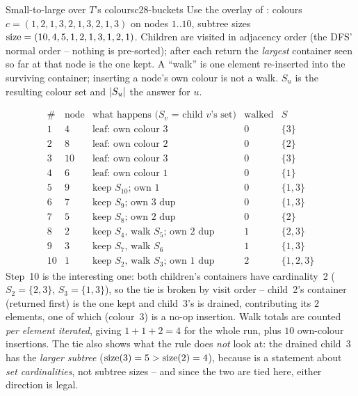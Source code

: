 \begin{example}{Small-to-large over \(T\)'s colours}{c28-buckets}
Use the overlay of : colours
\(c=(1,2,1,3,2,1,3,2,1,3)\) on nodes \(1..10\), subtree sizes
\(\operatorname{size}=(10,4,5,1,2,1,3,1,2,1)\).  Children are visited in adjacency order
(the DFS' normal order -- nothing is pre-sorted); after each return the
\emph{largest} container seen so far at that node is the one kept.  A
``walk'' is one element re-inserted into the surviving container; inserting a
node's own colour is not a walk.  \(S_u\) is the resulting colour set and
\(\lvert S_u\rvert\) the answer for \(u\).
\end{example}
\begin{tracebox}
{\small
\[
\renewcommand{\arraystretch}{1.2}
\begin{array}{c|c|l|c|c}
\text{\#} & \text{node} & \text{what happens (}S_v\text{ = child }v\text{'s set)} & \text{walked} & S \\ \hline
1 & 4 & \text{leaf: own colour } 3 & 0 & \{3\}\\
2 & 8 & \text{leaf: own colour } 2 & 0 & \{2\}\\
3 & 10& \text{leaf: own colour } 3 & 0 & \{3\}\\
4 & 6 & \text{leaf: own colour } 1 & 0 & \{1\}\\
5 & 9 & \text{keep } S_{10}\text{;}\text{ own } 1 & 0 & \{1,3\}\\
6 & 7 & \text{keep } S_{9}\text{;}\text{ own } 3\text{ dup} & 0 & \{1,3\}\\
7 & 5 & \text{keep } S_{8}\text{;}\text{ own } 2\text{ dup} & 0 & \{2\}\\
8 & 2 & \text{keep } S_{4}\text{, walk } S_{5}\text{;}\text{ own } 2\text{ dup} & 1 & \{2,3\}\\
9 & 3 & \text{keep } S_{7}\text{, walk } S_{6} & 1 & \{1,3\}\\
10& 1 & \text{keep } S_{2}\text{, walk } S_{3}\text{;}\text{ own } 1\text{ dup} & 2 & \{1,2,3\}
\end{array}
\]
}
Step~10 is the interesting one: both children's containers have
cardinality~2 (\(S_2=\{2,3\}\), \(S_3=\{1,3\}\)), so the tie is broken by
visit order -- child~2's container (returned first) is the one kept and
child~3's is drained, contributing its \(2\) elements, one of which (colour~3)
is a no-op insertion.  Walk totals are counted \emph{per element iterated},
giving \(1+1+2=4\) for the whole run, plus \(10\) own-colour insertions.
The tie also shows what the rule does \emph{not} look at: the drained child~3
has the \emph{larger subtree} (\(\operatorname{size}(3)=5>\operatorname{size}(2)=4\)), because
 is a statement about \emph{set cardinalities}, not subtree
sizes -- and since the two are tied here, either direction is legal.
\end{tracebox}

